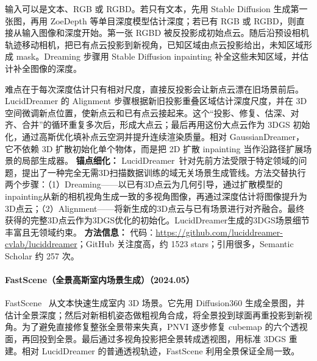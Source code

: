 输入可以是文本、RGB 或 RGBD。若只有文本，先用 Stable Diffusion 生成第一张图，再用 ZoeDepth 等单目深度模型估计深度；若已有 RGB 或 RGBD，则直接从输入图像和深度开始。第一张 RGBD 被反投影成初始点云。随后沿预设相机轨迹移动相机，把已有点云投影到新视角，已知区域由点云投影给出，未知区域形成 mask。Dreaming 步骤用 Stable Diffusion inpainting 补全这些未知区域，并估计补全图像的深度。

难点在于每次深度估计只有相对尺度，直接反投影会让新点云漂在旧场景前后。LucidDreamer 的 Alignment 步骤根据新旧投影重叠区域估计深度尺度，并在 3D 空间微调新点位置，使新点云和已有点云接起来。这个“投影、修复、估深、对齐、合并”的循环重复多次后，形成大点云；最后再用这份大点云作为 3DGS 初始化，通过高斯优化填补点云空洞并提升连续渲染质量。相对 GaussianDreamer，它不依赖 3D 扩散初始化单个物体，而是把 2D 扩散 inpainting 当作沿路径扩展场景的局部生成器。
\textbf{锚点细化：} LucidDreamer~\cite{2311_13384}针对先前方法受限于特定领域的问题，提出了一种完全无需3D扫描数据训练的域无关场景生成管线。方法交替执行两个步骤：（1）Dreaming——以已有3D点云为几何引导，通过扩散模型的inpainting从新的相机视角生成一致的多视角图像，再通过深度估计将图像提升为3D点云；（2）Alignment——将新生成的3D点云与已有场景进行对齐融合。最终获得的完整3D点云作为3DGS优化的初始化。LucidDreamer生成的3DGS场景细节丰富且无领域约束。
\textbf{方法信息：} 代码：\url{https://github.com/luciddreamer-cvlab/luciddreamer}；GitHub 关注度高，约 1523 stars；引用很多，Semantic Scholar 约 257 次。



\paragraph{FastScene（全景高斯室内场景生成）（2024.05）}
FastScene~\cite{2405_05768} 从文本快速生成室内 3D 场景。它先用 Diffusion360 生成全景图，并估计全景深度；然后对新相机姿态做粗视角合成，将全景投到球面再重投影到新视角。为了避免直接修复整张全景带来失真，PNVI 逐步修复 cubemap 的六个透视面，再回投到全景。最后通过多视角投影把全景转成透视图，用标准 3DGS 重建。相对 LucidDreamer 的普通透视轨迹，FastScene 利用全景保证全局一致。

